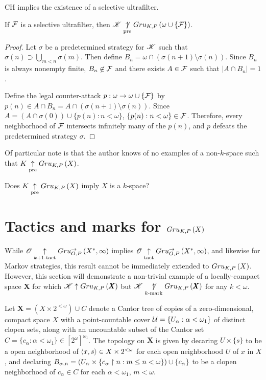 \begin{thm}
  CH implies the existence of a selective ultrafilter.
  \cite{MR0080902}
\end{thm}

\begin{thm}
  If $\mathcal{F}$ is a selective ultrafilter, then
  $\mathscr{K}\underset{\text{pre}}{\not\uparrow} Gru_{K,P}\left({\omega\cup\{\mathcal{F}\}}\right)$.
\end{thm}

\begin{proof}
  Let $\sigma$ be a predetermined strategy for $\mathscr{K}$ such that
  $\sigma(n)\supset\bigcup_{m<n}\sigma(m)$.
  Then define $B_n=\omega\cap(\sigma(n+1)\setminus\sigma(n))$. Since $B_n$
  is always nonempty finite, $B_n\not\in\mathcal{F}$ and there exists $A\in \mathcal{F}$
  such that $|A\cap B_n|=1$.

  Define the legal counter-attack $p:\omega\to\omega\cup\{\mathcal{F}\}$ by
  $p(n)\in A\cap B_n=A\cap(\sigma(n+1)\setminus\sigma(n))$. Since
  $A=(A\cap\sigma(0))\cup\{p(n):n<\omega\}$, $\{p(n):n<\omega\}\in\mathcal{F}$.
  Therefore, every neighborhood of $\mathcal{F}$ intersects infinitely many of
  the $p(n)$, and $p$ defeats the predetermined strategy $\sigma$.
\end{proof}

Of particular note is that the author knows of no examples of a
non-$k$-space such that $K\underset{\text{pre}}{\uparrow}Gru_{K,P}\left({X}\right)$.

\begin{ques}
  Does $K\underset{\text{pre}}{\uparrow}Gru_{K,P}\left({X}\right)$ imply $X$ is a $k$-space?
\end{ques}


\section{Tactics and marks for $Gru_{K,P}\left({X}\right)$}

While $\mathscr{O}\underset{k+1\text{-tact}}{\uparrow}Gru_{O,P}^{\to}\left({X^*},{\infty}\right)$ implies
$\mathscr{O}\underset{\text{tact}}{\uparrow}Gru_{O,P}^{\to}\left({X^*},{\infty}\right)$, and likewise for Markov
strategies, this result cannot be
immediately extended to $Gru_{K,P}\left({X}\right)$. However, this section will
demonstrate a non-trivial example of a locally-compact space $\pmb X$ for which
$\mathscr{K}\uparrow Gru_{K,P}\left({\pmb X}\right)$ but $\mathscr{K}\underset{k\text{-mark}}{\not\uparrow}Gru_{K,P}\left({\pmb X}\right)$
for any $k<\omega$.

\begin{defn}
  Let $\pmb X=(X\times 2^{<\omega})\cup C$ denote a Cantor tree
  of copies of a zero-dimensional, compact space $X$ with a point-countable
  cover $\mathcal{U} = \{U_\alpha : \alpha<\omega_1\}$ of distinct
  clopen sets, along with an uncountable subset of the Cantor set
  $C=\{c_\alpha:\alpha<\omega_1\}\in [2^\omega]^{\omega_1}$.
  The topology on $\pmb X$ is given by decaring $U\times\{s\}$ to be a open
  neighborhood of $\langle x,s\rangle\in X\times 2^{<\omega}$ for each
  open neighborhood $U$ of $x$ in $X$, and declaring
  $B_{\alpha,n}=(U_\alpha\times\{c_\alpha\restriction n: m\leq n<\omega\})\cup\{c_\alpha\}$
  to be a clopen neighborhood of $c_\alpha\in C$ for each $\alpha<\omega_1$,
  $m<\omega$.
\end{defn}

